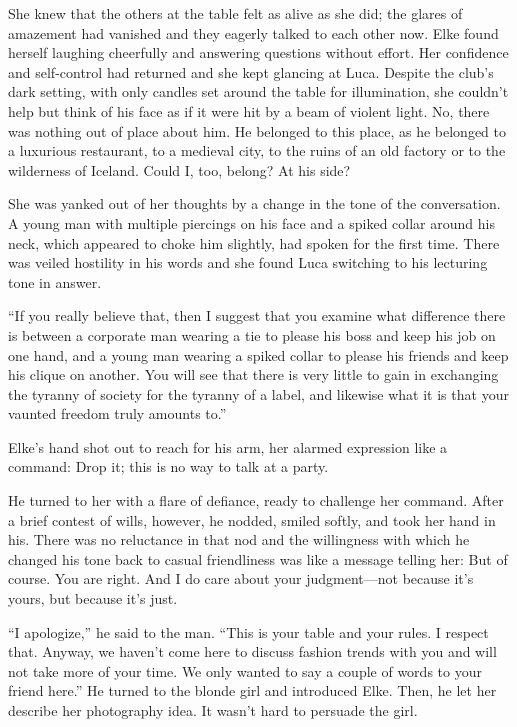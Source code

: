 She knew that the others at the table felt as alive as she did; the glares of amazement had vanished and they eagerly talked to each other now. Elke found herself laughing cheerfully and answering questions without effort. Her confidence and self-control had returned and she kept glancing at Luca. Despite the club's dark setting, with only candles set around the table for illumination, she couldn't help but think of his face as if it were hit by a beam of violent light. No, there was nothing out of place about him. He belonged to this place, as he belonged to a luxurious restaurant, to a medieval city, to the ruins of an old factory or to the wilderness of Iceland. Could I, too, belong? At his side?

She was yanked out of her thoughts by a change in the tone of the conversation. A young man with multiple piercings on his face and a spiked collar around his neck, which appeared to choke him slightly, had spoken for the first time. There was veiled hostility in his words and she found Luca switching to his lecturing tone in answer.

``If you really believe that, then I suggest that you examine what difference there is between a corporate man wearing a tie to please his boss and keep his job on one hand, and a young man wearing a spiked collar to please his friends and keep his clique on another. You will see that there is very little to gain in exchanging the tyranny of society for the tyranny of a label, and likewise what it is that your vaunted freedom truly amounts to.''

Elke's hand shot out to reach for his arm, her alarmed expression like a command: Drop it; this is no way to talk at a party.

He turned to her with a flare of defiance, ready to challenge her command. After a brief contest of wills, however, he nodded, smiled softly, and took her hand in his. There was no reluctance in that nod and the willingness with which he changed his tone back to casual friendliness was like a message telling her: But of course. You are right. And I do care about your judgment---not because it's yours, but because it's just.

``I apologize,'' he said to the man. ``This is your table and your rules. I respect that. Anyway, we haven't come here to discuss fashion trends with you and will not take more of your time. We only wanted to say a couple of words to your friend here.'' He turned to the blonde girl and introduced Elke. Then, he let her describe her photography idea. It wasn't hard to persuade the girl.

